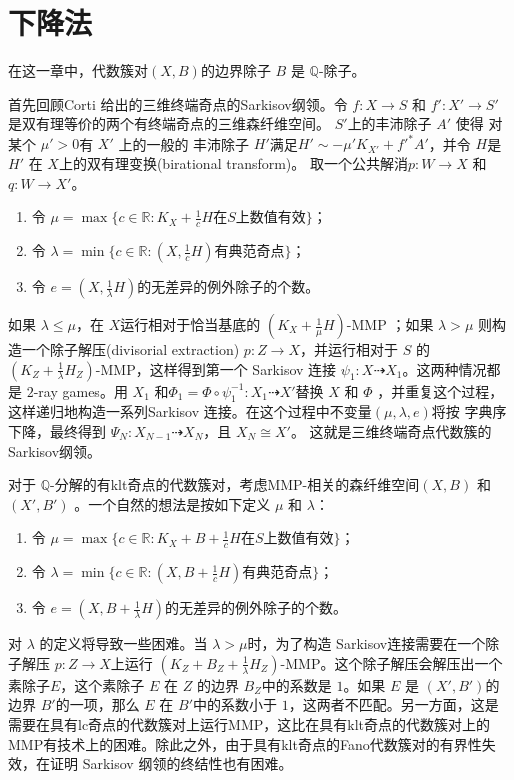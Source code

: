 \chapter{下降法}
在这一章中，代数簇对$(X,B)$的边界除子 $B$ 是 $\mathbb{Q}$-除子。 

首先回顾Corti \cite{cortiFactoringBirationalMaps} 给出的三维终端奇点的Sarkisov纲领。令 $f: X\to S$ 和 $f':X'\to S'$ 是双有理等价的两个有终端奇点的三维森纤维空间。
 $S'$上的丰沛除子 $A'$ 使得 对某个 $\mu'>0$有 $X'$ 上的一般的 丰沛除子 $H'$满足$H'\sim -\mu'K_{X'}+f'^*A'$，并令 $H$是  $H'$ 在 $X$上的双有理变换(birational transform)。 取一个公共解消$p: W\to X$ 和 $q:W \to X'$。
\begin{enumerate}
  \item 令 $\mu= \max \{c \in \mathbb{R} : K_{X}+\frac{1}{c}H \text{在} S \text{上数值有效} \}$；
  \item 令 $\lambda = \min \{c\in \mathbb{R}: (X,\frac{1}{c}H) \text{有典范奇点}  \}$；
  \item 令 $e =  (X,\frac{1}{\lambda}H)\text{的无差异的例外除子的个数} $。
\end{enumerate}
如果 $\lambda \leqslant \mu$，在 $X$运行相对于恰当基底的 $(K_X+\frac{1}{\mu}H)$-MMP ；如果 $\lambda > \mu$ 则构造一个除子解压(divisorial extraction) $ p:Z \to X$，并运行相对于 $ S$ 的 $(K_Z+\frac{1}{\lambda}H_Z)$-MMP，这样得到第一个 Sarkisov 连接 $\psi_1: X\dashrightarrow  X_{1}$。这两种情况都是 $2$-ray games。用 $X_{1}$ 和$\Phi_{1}=\Phi\circ\psi_1^{-1}: X_1\dashrightarrow X'$替换 $X$ 和 $\Phi$ ，并重复这个过程，这样递归地构造一系列Sarkisov 连接。在这个过程中不变量$(\mu,\lambda,e)$将按 字典序下降，最终得到 $\Psi_{N}:X_{N-1} \dashrightarrow X_{N}$，且 $X_{N}\cong X'$。 这就是三维终端奇点代数簇的Sarkisov纲领。

对于 $\mathbb{Q}$-分解的有klt奇点的代数簇对，考虑MMP-相关的森纤维空间$(X,B)$ 和 $(X',B')$ 。一个自然的想法是按如下定义 $\mu$ 和 $\lambda$：
\begin{enumerate}
  \item 令 $\mu= \max \{c \in \mathbb{R} : K_{X}+B+\frac{1}{c}H \text{在} S \text{上数值有效} \}$；
  \item 令 $\lambda = \min \{c\in \mathbb{R}: (X,B+\frac{1}{c}H) \text{有典范奇点}  \}$；
  \item 令 $e =  (X,B+\frac{1}{\lambda}H)\text{的无差异的例外除子的个数} $。
\end{enumerate}

对 $\lambda$ 的定义将导致一些困难。当 $\lambda > \mu$时，为了构造 Sarkisov连接需要在一个除子解压 $p:Z \to X$上运行 $(K_Z+B_Z+\frac{1}{\lambda}H_Z)$-MMP。这个除子解压会解压出一个素除子$E$，这个素除子 $E$ 在 $Z$ 的边界  $B_Z$中的系数是 $1$。如果 $E$ 是 $(X',B')$的边界 $B'$的一项，那么 $E$ 在 $B'$中的系数小于 $1$，这两者不匹配。另一方面，这是需要在具有lc奇点的代数簇对上运行MMP，这比在具有klt奇点的代数簇对上的MMP有技术上的困难。除此之外，由于具有klt奇点的Fano代数簇对的有界性失效，在证明 Sarkisov 纲领的终结性也有困难。

